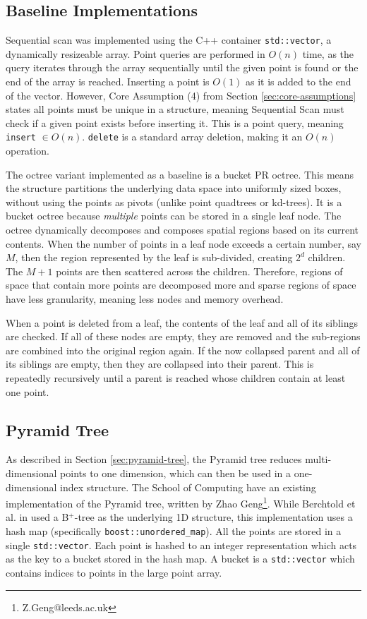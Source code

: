 \subsection{Baseline Implementations}
 
Sequential scan was implemented using the C++ container \texttt{std::vector}, a dynamically resizeable array.  Point queries are performed in $O(n)$ time, as the query iterates through the array sequentially until the given point is found or the end of the array is reached. Inserting a point is $O(1)$ as it is added to the end of the vector. However, Core Assumption (4) from Section \ref{sec:core-assumptions} states all points must be unique in a structure, meaning Sequential Scan must check if a given point exists before inserting it. This is a point query, meaning \texttt{insert} $\in O(n)$. \texttt{delete} is a standard array deletion, making it an $O(n)$ operation.

The octree variant implemented as a baseline is a bucket PR octree. This means the structure partitions the underlying data space into uniformly sized boxes, without using the points as pivots (unlike point quadtrees or kd-trees). It is a bucket octree because \textit{multiple} points can be stored in a single leaf node. The octree dynamically decomposes and composes spatial regions based on its current contents. When the number of points in a leaf node exceeds a certain number, say $M$, then the region represented by the leaf is sub-divided, creating $2^d$ children. The $M + 1$ points are then scattered across the children. Therefore, regions of space that contain more points are decomposed more and sparse regions of space have less granularity, meaning less nodes and memory overhead.

When a point is deleted from a leaf, the contents of the leaf and all of its siblings are checked. If all of these nodes are empty, they are removed and the sub-regions are combined into the original region again. If the now collapsed parent and all of its siblings are empty, then they are collapsed into their parent. This is repeatedly recursively until a parent is reached whose children contain at least one point.

\subsection{Pyramid Tree}

As described in Section \ref{sec:pyramid-tree}, the Pyramid tree reduces multi-dimensional points to one dimension, which can then be used in a one-dimensional index structure. The School of Computing have an existing implementation of the Pyramid tree, written by Zhao Geng\footnote{Z.Geng@leeds.ac.uk}. While Berchtold et al. in \cite{pyramid-tree} used a B${}^{+}$-tree as the underlying 1D structure, this implementation uses a hash map (specifically \texttt{boost::unordered\_map}). All the points are stored in a single \texttt{std::vector}. Each point is hashed to an integer representation which acts as the key to a bucket stored in the hash map. A bucket is a \texttt{std::vector} which contains indices to points in the large point array.

